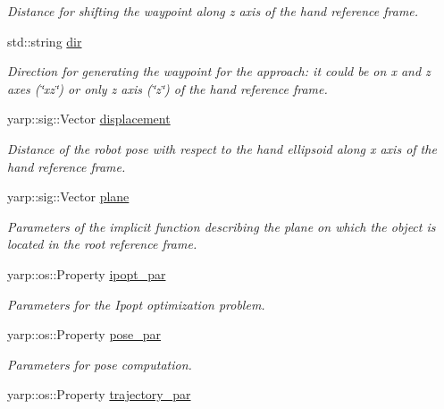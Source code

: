 \begin{DoxyCompactItemize}
\begin{DoxyCompactList}\small\item\em Distance for shifting the waypoint along z axis of the hand reference frame. \end{DoxyCompactList}\item 
std\+::string \hyperlink{classGraspComputation_a362c9280e813cfcbb1b0b4153fabc88c}{dir}
\begin{DoxyCompactList}\small\item\em Direction for generating the waypoint for the approach\+: it could be on x and z axes (\char`\"{}xz\char`\"{}) or only z axis (\char`\"{}z\char`\"{}) of the hand reference frame. \end{DoxyCompactList}\item 
yarp\+::sig\+::\+Vector \hyperlink{classGraspComputation_a8cc4909b0e1fa249df366926b91bae74}{displacement}\label{classGraspComputation_a8cc4909b0e1fa249df366926b91bae74}

\begin{DoxyCompactList}\small\item\em Distance of the robot pose with respect to the hand ellipsoid along x axis of the hand reference frame. \end{DoxyCompactList}\item 
yarp\+::sig\+::\+Vector \hyperlink{classGraspComputation_ae2f9c475883f512cb132479ee7896a24}{plane}\label{classGraspComputation_ae2f9c475883f512cb132479ee7896a24}

\begin{DoxyCompactList}\small\item\em Parameters of the implicit function describing the plane on which the object is located in the root reference frame. \end{DoxyCompactList}\item 
yarp\+::os\+::\+Property \hyperlink{classGraspComputation_a616f3c17653d2e4d500ce7dbf9849917}{ipopt\+\_\+par}\label{classGraspComputation_a616f3c17653d2e4d500ce7dbf9849917}

\begin{DoxyCompactList}\small\item\em Parameters for the Ipopt optimization problem. \end{DoxyCompactList}\item 
yarp\+::os\+::\+Property \hyperlink{classGraspComputation_a8903e5f9411e6a064d767b4c75c7f3bd}{pose\+\_\+par}\label{classGraspComputation_a8903e5f9411e6a064d767b4c75c7f3bd}

\begin{DoxyCompactList}\small\item\em Parameters for pose computation. \end{DoxyCompactList}\item 
yarp\+::os\+::\+Property \hyperlink{classGraspComputation_a72510e6516dab20c66c39e6eae157f3c}{trajectory\+\_\+par}\label{classGraspComputation_a72510e6516dab20c66c39e6eae157f3c}


\end{DoxyCompactItemize}
